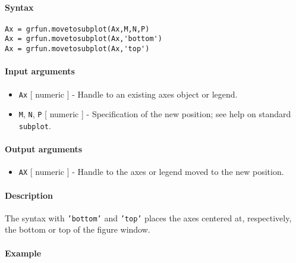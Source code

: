 


	\paragraph{Syntax}\label{syntax}

\begin{verbatim}
Ax = grfun.movetosubplot(Ax,M,N,P)
Ax = grfun.movetosubplot(Ax,'bottom')
Ax = grfun.movetosubplot(Ax,'top')
\end{verbatim}

\paragraph{Input arguments}\label{input-arguments}

\begin{itemize}
\item
  \texttt{Ax} {[} numeric {]} - Handle to an existing axes object or
  legend.
\item
  \texttt{M}, \texttt{N}, \texttt{P} {[} numeric {]} - Specification of
  the new position; see help on standard \texttt{subplot}.
\end{itemize}

\paragraph{Output arguments}\label{output-arguments}

\begin{itemize}
\itemsep1pt\parskip0pt
\item
  \texttt{AX} {[} numeric {]} - Handle to the axes or legend moved to
  the new position.
\end{itemize}

\paragraph{Description}\label{description}

The syntax with \texttt{'bottom'} and \texttt{'top'} places the axes
centered at, respectively, the bottom or top of the figure window.

\paragraph{Example}\label{example}


